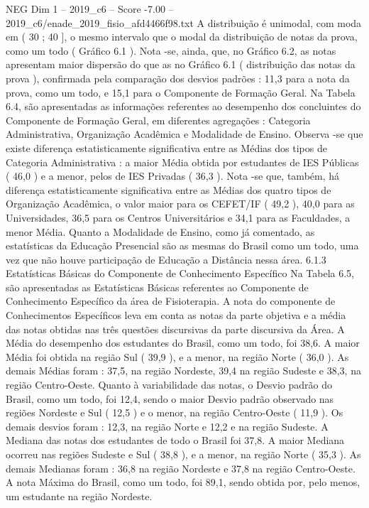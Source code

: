 \begin{textsample}{NEG Dim 1 – 2019\_c6 – Score -7.00 – 2019\_c6/enade\_2019\_fisio\_afd4466f98.txt}
A distribuição é unimodal, com moda em ( 30 ; 40 ], o mesmo intervalo que o modal da distribuição de notas da prova, como um todo ( Gráfico 6.1 ).
Nota -se, ainda, que, no Gráfico 6.2, as notas apresentam maior dispersão do que as no Gráfico 6.1 ( distribuição das notas da prova ), confirmada pela comparação dos desvios padrões : 11,3 para a nota da prova, como um todo, e 15,1 para o Componente de Formação Geral.
Na Tabela 6.4, são apresentadas as informações referentes ao desempenho dos concluintes do Componente de Formação Geral, em diferentes agregações : Categoria Administrativa, Organização Acadêmica e Modalidade de Ensino.
Observa -se que existe diferença estatisticamente significativa entre as Médias dos tipos de Categoria Administrativa : a maior Média obtida por estudantes de IES Públicas ( 46,0 ) e a menor, pelos de IES Privadas ( 36,3 ).
Nota -se que, também, há diferença estatisticamente significativa entre as Médias dos quatro tipos de Organização Acadêmica, o valor maior para os CEFET/IF ( 49,2 ), 40,0 para as Universidades, 36,5 para os Centros Universitários e 34,1 para as Faculdades, a menor Média.
Quanto a Modalidade de Ensino, como já comentado, as estatísticas da Educação Presencial são as mesmas do Brasil como um todo, uma vez que não houve participação de Educação a Distância nessa área. 6.1.3 Estatísticas Básicas do Componente de Conhecimento Específico Na Tabela 6.5, são apresentadas as Estatísticas Básicas referentes ao Componente de Conhecimento Específico da área de Fisioterapia.
A nota do componente de Conhecimentos Específicos leva em conta as notas da parte objetiva e a média das notas obtidas nas três questões discursivas da parte discursiva da Área.
A Média do desempenho dos estudantes do Brasil, como um todo, foi 38,6.
A maior Média foi obtida na região Sul ( 39,9 ), e a menor, na região Norte ( 36,0 ).
As demais Médias foram : 37,5, na região Nordeste, 39,4 na região Sudeste e 38,3, na região Centro-Oeste.
Quanto à variabilidade das notas, o Desvio padrão do Brasil, como um todo, foi 12,4, sendo o maior Desvio padrão observado nas regiões Nordeste e Sul ( 12,5 ) e o menor, na região Centro-Oeste ( 11,9 ).
Os demais desvios foram : 12,3, na região Norte e 12,2 e na região Sudeste.
A Mediana das notas dos estudantes de todo o Brasil foi 37,8.
A maior Mediana ocorreu nas regiões Sudeste e Sul ( 38,8 ), e a menor, na região Norte ( 35,3 ).
As demais Medianas foram : 36,8 na região Nordeste e 37,8 na região Centro-Oeste.
A nota Máxima do Brasil, como um todo, foi 89,1, sendo obtida por, pelo menos, um estudante na região Nordeste.

\end{textsample}
